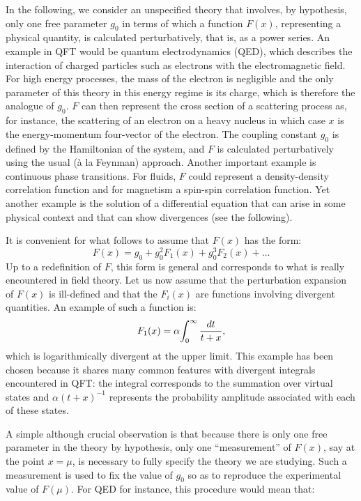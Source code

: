 \documentclass[floatfix,preprintnumbers,amsmath,amssymb,prb,12pt]{revtex4-1}
\begin{document}
In the following, we consider an unspecified theory that
involves, by hypothesis, only one free parameter $g_0$
in terms of which a function
$F(x)$, representing a physical quantity, is calculated
perturbatively, that is, as a power series. An example in QFT
would be quantum electrodynamics (QED), which describes the
interaction of charged particles such as electrons with the
electromagnetic field. For high energy processes, the mass of the
electron is negligible and the only parameter of this theory in
this energy regime is its charge, which is therefore the analogue
of $g_0$.
$F$ can then represent the cross section of a scattering process
as, for instance, the scattering of an electron on a heavy nucleus
in which case $x$ is the energy-momentum four-vector of the
electron. The coupling constant $g_0$ is defined by the
Hamiltonian of the system, and $F$ is calculated perturbatively
using the usual (\`a la Feynman) approach. Another important
example is continuous phase transitions. For fluids,
$F$ could represent a density-density correlation function and for
magnetism a spin-spin correlation function.\cite{foot3} Yet
another example is the solution of a differential equation that
can arise in some physical context and that can show divergences
(see the following).

It is convenient for what follows to assume that $F(x)$ has the
form:
\begin{equation}
F(x)= g_0 +g_0^2 F_1(x) + g_0^3 F_2(x) + \dots
\label{developpement}
\end{equation}
Up to a redefinition of $F$, this form is general and corresponds 
to what is really encountered in field
theory. Let us now assume that the perturbation expansion of $F(x)$ is
ill-defined and that the
$F_i(x)$ are functions involving divergent quantities. An example of such a function is:
\begin{equation}
F_1(x)= \alpha \! \int_0^\infty {dt\over t+x},
\label{exemple}
\end{equation}
which is logarithmically divergent at the upper limit. This example
has been chosen because it shares many common features with
divergent integrals encountered in QFT: the integral corresponds to
the summation over virtual states and $\alpha (t+x)^{-1}$
represents the probability amplitude associated with each of these
states.\cite{foot4}

A simple although crucial observation is that because there is only
one free parameter in the theory by
hypothesis, only one ``measurement'' of
$F(x)$, say at the point $x=\mu$, is necessary to fully specify the
theory we are studying. Such a measurement is used to fix the value of $g_0$ 
so as to reproduce the experimental value of $F(\mu)$. For QED for instance, 
this procedure would mean that:
\end{document}
